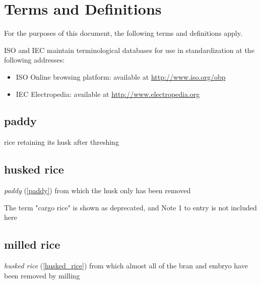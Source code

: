 \section{Terms and Definitions}

For the purposes of this document, the following terms and definitions apply.

ISO and IEC maintain terminological databases for use in standardization at the following addresses:

\begin{itemize}
  \item ISO Online browsing platform: available at \url{http://www.iso.org/obp}
  \item IEC Electropedia: available at \url{http://www.electropedia.org}
\end{itemize}

\subsection*{paddy}
\label{paddy}

rice retaining its husk after threshing

\begin{source}
\end{source}

\subsection*{husked rice}
\label{husked_rice}

\textit{paddy} (\ref{paddy}) from which the husk only has been removed

\begin{source}
The term "cargo rice" is shown as deprecated, and Note 1 to entry is not included here
\end{source}

\subsection*{milled rice}

\textit{husked rice} (\ref{husked_rice}) from which almost all of the bran and embryo have been removed by milling

\begin{source}
\end{source}

